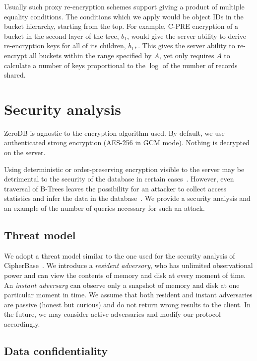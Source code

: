 \documentclass[notitlepage,longbibliography]{revtex4-1}
\begin{document}
Usually such proxy re-encryption schemes support giving a product of multiple equality conditions.
The conditions which we apply would be object IDs in the bucket hierarchy, starting from the top.
For example, C-PRE encryption of a bucket in the second layer of the tree, $b_1$, would give the server ability to derive re-encryption keys for all of its children, $b_{1*}$.
This gives the server ability to re-encrypt all buckets within the range specified by $A$, yet only requires $A$ to calculate a number of keys proportional to the $\log$ of the number of records shared.

\section{Security analysis}

ZeroDB is agnostic to the encryption algorithm used.
By default, we use authenticated strong encryption ({AES-256} in GCM mode).
Nothing is decrypted on the server.

Using deterministic or order-preserving encryption visible to the server may be detrimental to the security of the database in certain cases~\cite{cryptdb-hacked}.
However, even traversal of B-Trees leaves the possibility for an attacker to collect access statistics and infer the data in the database~\cite{access-pattern-attack}.
We provide a security analysis and an example of the number of queries necessary for such an attack.

\subsection{Threat model}

We adopt a threat model similar to the one used for the security analysis of CipherBase~\cite{cipherbase}.
We introduce a \emph{resident adversary}, who has unlimited observational power and can view the contents of memory and disk at every moment of time.
An \emph{instant adversary} can observe only a snapshot of memory and disk at one particular moment in time.
We assume that both resident and instant adversaries are passive (honest but curious) and do not return wrong results to the client.
In the future, we may consider active adversaries and modify our protocol accordingly.

\subsection{Data confidentiality}
\end{document}
